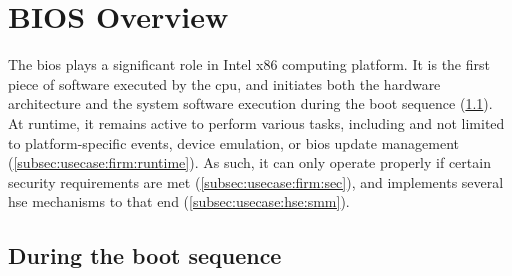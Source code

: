 %

\section{BIOS Overview}
\label{sec:usecase:firmware}

The \ac{bios} plays a significant role in Intel x86 computing platform.
%
It is the first piece of software executed by the \ac{cpu}, and initiates both
the hardware architecture and the system software execution during the boot
sequence (\ref{subsec:usecase:firm:boot}).
%
At runtime, it remains active to perform various tasks, including and not
limited to platform-specific events, device emulation, or \ac{bios} update
management (\ref{subsec:usecase:firm:runtime}).
%
As such, it can only operate properly if certain security requirements are met
(\ref{subsec:usecase:firm:sec}), and implements several \ac{hse} mechanisms to
that end (\ref{subsec:usecase:hse:smm}).

\subsection{During the boot sequence}
\label{subsec:usecase:firm:boot}

